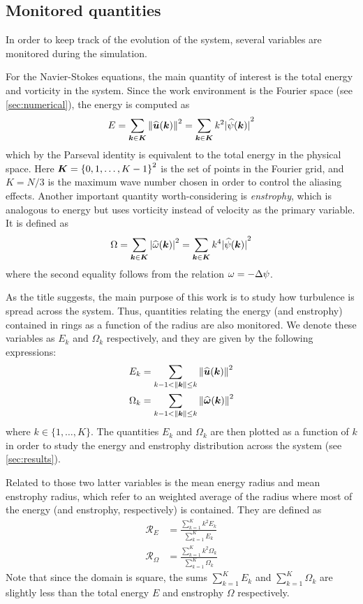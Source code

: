 \documentclass[../main.tex]{subfiles}
\begin{document}
\subsection{Monitored quantities}
In order to keep track of the evolution of the system, several variables are monitored during the simulation.

For the Navier-Stokes equations, the main quantity of interest is the total energy and vorticity in the system. Since the work environment is the Fourier space (see \cref{sec:numerical}), the energy is computed as
\begin{equation}
	E = \sum_{\boldsymbol{k}\in\boldsymbol{K}} \left\|\widehat{\boldsymbol{u}}(\boldsymbol{k})\right\|^2 = \sum_{\boldsymbol{k}\in\boldsymbol{K}} k^2 {|\widehat{\psi}(\boldsymbol{k})|}^2
\end{equation}
which by the Parseval identity is equivalent to the total energy in the physical space. Here $\boldsymbol{K} = {\{0,1,\ldots,K-1\}}^2$ is the set of points in the Fourier grid, and $K=N/3$ is the maximum wave number chosen in order to control the aliasing effects. Another important quantity worth-considering is \emph{enstrophy}, which is analogous to energy but uses vorticity instead of velocity as the primary variable. It is defined as
\begin{equation}
	\Omega = \sum_{\boldsymbol{k}\in\boldsymbol{K}} {|\widehat{\omega}(\boldsymbol{k})|}^2 = \sum_{\boldsymbol{k}\in\boldsymbol{K}} k^4 {|\widehat{\psi}(\boldsymbol{k})|}^2
\end{equation}
where the second equality follows from the relation $\omega = -\Delta \psi$.

As the title suggests, the main purpose of this work is to study how turbulence is spread across the system. Thus, quantities relating the energy (and enstrophy) contained in rings as a function of the radius are also monitored. We denote these variables as $E_k$ and $\Omega_k$ respectively, and they are given by the following expressions:
\begin{align}
	E_k      & = \sum_{k-1<\left\|\boldsymbol{k}\right\|\leq k} \left\|\widehat{\boldsymbol{u}}(\boldsymbol{k})\right\|^2      \\
	\Omega_k & = \sum_{k-1<\left\|\boldsymbol{k}\right\|\leq k} \left\|\widehat{\boldsymbol{\omega}}(\boldsymbol{k})\right\|^2
\end{align}
where $k\in\{1,\ldots,K\}$. The quantities $E_k$ and $\Omega_k$ are then plotted as a function of $k$ in order to study the energy and enstrophy distribution across the system (see \cref{sec:results}).

Related to those two latter variables is the mean energy radius and mean enstrophy radius, which refer to an weighted average of the radius where most of the energy (and enstrophy, respectively) is contained. They are defined as
\begin{align}
	\mathcal{R}_E      & = \frac{\sum_{k=1}^{K} k^2 E_k}{\sum_{k=1}^{K} E_k}           \\
	\mathcal{R}_\Omega & = \frac{\sum_{k=1}^{K} k^2 \Omega_k}{\sum_{k=1}^{K} \Omega_k}
\end{align}
Note that since the domain is square, the sums $\sum_{k=1}^{K} E_k$ and $\sum_{k=1}^{K} \Omega_k$ are slightly less than the total energy $E$ and enstrophy $\Omega$ respectively.
\end{document}
